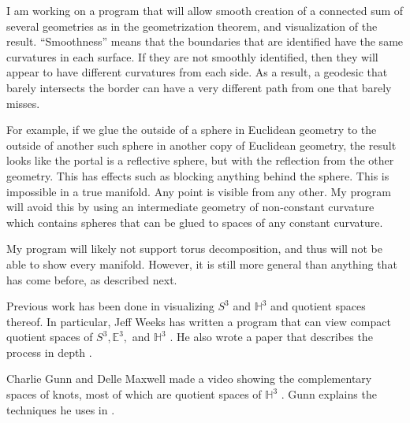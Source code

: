 \documentclass[12pt]{amsart}
\begin{document}

I am working on a program that will allow smooth creation of a connected sum of several geometries as in the geometrization theorem, and visualization of the result. ``Smoothness'' means that the boundaries that are identified have the same curvatures in each surface. If they are not smoothly identified, then they will appear to have different curvatures from each side. As a result, a geodesic that barely intersects the border can have a very different path from one that barely misses.

For example, if we glue the outside of a sphere in Euclidean geometry to the outside of another such sphere in another copy of Euclidean geometry, the result looks like the portal is a reflective sphere, but with the reflection from the other geometry. This has effects such as blocking anything behind the sphere. This is impossible in a true manifold. Any point is visible from any other. My program will avoid this by using an intermediate geometry of non-constant curvature which contains spheres that can be glued to spaces of any constant curvature.

My program will likely not support torus decomposition, and thus will not be able to show every manifold. However, it is still more general than anything that has come before, as described next.






Previous work has been done in visualizing $S^3$ and $\mathbb{H}^3$ and quotient spaces thereof. In particular, Jeff Weeks has written a program that can view compact quotient spaces of $S^3, \mathbb{E}^3,$ and $\mathbb{H}^3$ \cite{CurvedSpaces}. He also wrote a paper that describes the process in depth \cite{CurvedSpacesPaper}.

Charlie Gunn and Delle Maxwell made a video showing the complementary spaces of knots, most of which are quotient spaces of $\mathbb{H}^3$ \cite{NotKnot}. Gunn explains the techniques he uses in \cite{CharlieGunn} \cite{CharlieGunn2}.
\end{document}
